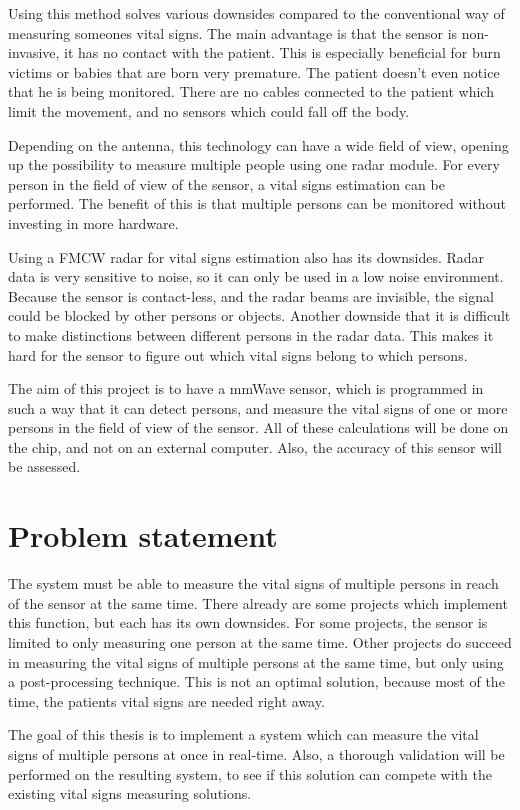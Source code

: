 Using this method solves various downsides compared to the conventional way of measuring someones vital signs. The main advantage is that the sensor is non-invasive, it has no contact with the patient. This is especially beneficial for burn victims or babies that are born very premature. The patient doesn't even notice that he is being monitored. There are no cables connected to the patient which limit the movement, and no sensors which could fall off the body. 

Depending on the antenna, this technology can have a wide field of view, opening up the possibility to measure multiple people using one radar module. For every person in the field of view of the sensor, a vital signs estimation can be performed. The benefit of this is that multiple persons can be monitored without investing in more hardware.

Using a FMCW radar for vital signs estimation also has its downsides. Radar data is very sensitive to noise, so it can only be used in a low noise environment. Because the sensor is contact-less, and the radar beams are invisible, the signal could be blocked by other persons or objects. Another downside that it is difficult to make distinctions between different persons in the radar data. This makes it hard for the sensor to figure out which vital signs belong to which persons.

The aim of this project is to have a mmWave sensor, which is programmed in such a way that it can detect persons, and measure the vital signs of one or more persons in the field of view of the sensor. All of these calculations will be done on the chip, and not on an external computer. Also, the accuracy of this sensor will be assessed.

\section{Problem statement}
\label{sec:problem_statement}
The system must be able to measure the vital signs of multiple persons in reach of the sensor at the same time. There already are some projects which implement this function, but each has its own downsides. For some projects, the sensor is limited to only measuring one person at the same time. Other projects do succeed in measuring the vital signs of multiple persons at the same time, but only using a post-processing technique. This is not an optimal solution, because most of the time, the patients vital signs are needed right away. 

The goal of this thesis is to implement a system which can measure the vital signs of multiple persons at once in real-time. Also, a thorough validation will be performed on the resulting system, to see if this solution can compete with the existing vital signs measuring solutions.

